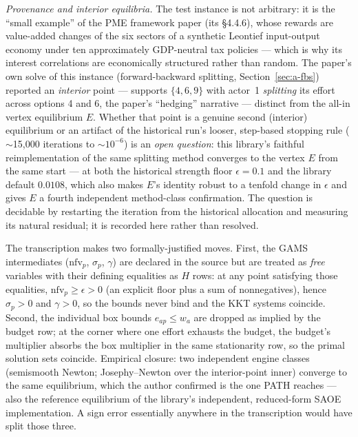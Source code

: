 \emph{Provenance and interior equilibria.} The test instance is not
arbitrary: it is the ``small example'' of the PME framework paper (its
\S4.4.6), whose rewards are value-added changes of the six sectors of a
synthetic Leontief input-output economy under ten approximately
GDP-neutral tax policies --- which is why its interest correlations are
economically structured rather than random. The paper's own solve of this
instance (forward-backward splitting, Section~\ref{sec:a-fbs}) reported an
\emph{interior} point --- supports $\{4, 6, 9\}$ with actor~1
\emph{splitting} its effort across options 4 and 6, the paper's
``hedging'' narrative --- distinct from the all-in vertex equilibrium $E$.
Whether that point is a genuine second (interior) equilibrium or an
artifact of the historical run's looser, step-based stopping rule
($\sim$15{,}000 iterations to $\sim$$10^{-6}$) is an \emph{open question}:
this library's faithful reimplementation of the same splitting method
converges to the vertex $E$ from the same start --- at both the historical
strength floor $\epsilon = 0.1$ and the library default $0.0108$, which
also makes $E$'s identity robust to a tenfold change in $\epsilon$ and
gives $E$ a fourth independent method-class confirmation. The question is
decidable by restarting the iteration from the historical allocation and
measuring its natural residual; it is recorded here rather than resolved.

The transcription makes two formally-justified moves. First, the GAMS
intermediates ($\mathrm{nfv}_p$, $\sigma_p$, $\gamma$) are declared
 in the source but are treated as \emph{free} variables with
their defining equalities as $H$ rows: at any point satisfying those
equalities, $\mathrm{nfv}_p \ge \epsilon > 0$ (an explicit floor plus a sum
of nonnegatives), hence $\sigma_p > 0$ and $\gamma > 0$, so the bounds
never bind and the KKT systems coincide. Second, the individual box bounds
$e_{ap} \le w_a$ are dropped as implied by the budget row; at the corner
where one effort exhausts the budget, the budget's multiplier absorbs the
box multiplier in the same stationarity row, so the primal solution sets
coincide. Empirical closure: two independent engine classes (semismooth
Newton; Josephy--Newton over the interior-point inner) converge to the same
equilibrium, which the author confirmed is the one PATH reaches --- also
the reference equilibrium of the library's independent, reduced-form SAOE
implementation. A sign error essentially anywhere in the transcription
would have split those three.

